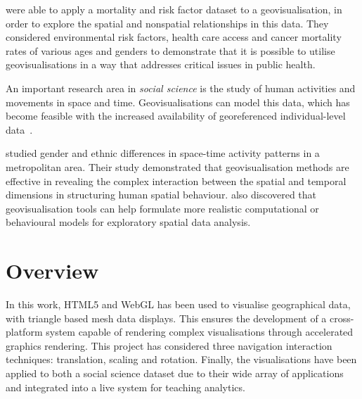 {	\textcite{maceachren2004geovisualization} were able to apply a mortality and risk factor dataset to a geovisualisation, in order to explore the spatial and nonspatial relationships in this data. They considered environmental risk factors, health care access and cancer mortality rates of various ages and genders to demonstrate that it is possible to utilise geovisualisations in a way that addresses critical issues in public health.

	An important research area in \emph{social science} is the study of human activities and movements in space and time. Geovisualisations can model this data, which has become feasible with the increased availability of georeferenced individual-level data~\parencite{kwan2004geovisualization}.

	\textcite{kwan2004geovisualization} studied gender and ethnic differences in space-time activity patterns in a metropolitan area. Their study demonstrated that geovisualisation methods are effective in revealing the complex interaction between the spatial and temporal dimensions in structuring human spatial behaviour. \citeauthor{kwan2004geovisualization} also discovered that geovisualisation tools can help formulate more realistic computational or behavioural models for exploratory spatial data analysis.

}

\section{Overview} {

	In this work, HTML5 and WebGL has been used to visualise geographical data, with triangle based mesh data displays. This ensures the development of a cross-platform system capable of rendering complex visualisations through accelerated graphics rendering. This project has considered three navigation interaction techniques: translation, scaling and rotation. Finally, the visualisations have been applied to both a social science dataset due to their wide array of applications and integrated into a live system for teaching analytics.

}
